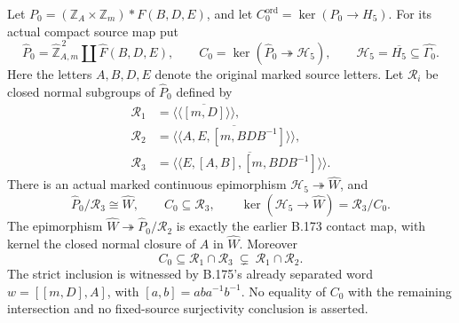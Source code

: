 Let \(P_0=(\mathbb Z_A\times\mathbb Z_m)*F(B,D,E)\),
and let \(C_0^{\mathrm{ord}}=\ker(P_0\to H_5)\).
For its actual compact source map put
\[
 \widehat P_0=\widehat{\mathbb Z}^{\,2}_{A,m}
                 \amalg\widehat F(B,D,E),\qquad
 C_0=\ker(\widehat P_0\twoheadrightarrow\mathcal H_5),
 \qquad\mathcal H_5=\overline{H_5}\subseteq\widehat{\Gamma_0}.
\]
Here the letters \(A,B,D,E\) denote the original marked source
letters. Let \(\mathcal R_i\) be closed normal subgroups of
\(\widehat P_0\) defined by
\begin{equation}\label{eq:B177-kernels}
\begin{aligned}
 \mathcal R_1&=\overline{\langle\!\langle[m,D]\rangle\!\rangle},\\
 \mathcal R_2&=\overline{\langle\!\langle
                  A,E,[m,BDB^{-1}]\rangle\!\rangle},\\
 \mathcal R_3&=\overline{\langle\!\langle
                  E,[A,B],[m,BDB^{-1}]\rangle\!\rangle}.
\end{aligned}
\end{equation}
There is an actual marked continuous epimorphism
\(\mathcal H_5\twoheadrightarrow\widehat W\), and
\begin{equation}\label{eq:B177-compact}
 \widehat P_0/\mathcal R_3\cong\widehat W,
 \qquad C_0\subseteq\mathcal R_3,
 \qquad
 \ker(\mathcal H_5\to\widehat W)=\mathcal R_3/C_0.
\end{equation}
The epimorphism \(\widehat W\twoheadrightarrow
\widehat P_0/\mathcal R_2\) is exactly the earlier B.173 contact
map, with kernel the closed normal closure of \(A\) in \(\widehat W\).
Moreover
\begin{equation}\label{eq:B177-strict}
 C_0\subseteq\mathcal R_1\cap\mathcal R_3
       \ \subsetneq\ \mathcal R_1\cap\mathcal R_2.
\end{equation}
The strict inclusion is witnessed by B.175's already separated word
\(w=[[m,D],A]\), with \([a,b]=aba^{-1}b^{-1}\).
No equality of \(C_0\) with the remaining intersection and no
fixed-source surjectivity conclusion is asserted.

